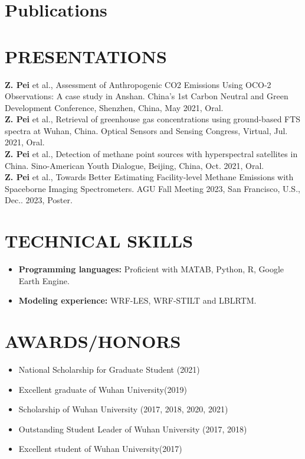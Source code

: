 \documentclass[a4paper,12pt]{article}
\begin{document}
\section{Publications}
\begin{refsection}
\nocite{*}
\printbibliography[heading=none]
\end{refsection}


\section{PRESENTATIONS}
\noindent[1]\quad\textbf{Z. Pei}  et al., Assessment of Anthropogenic CO2 Emissions Using OCO-2 Observations: A case study in Anshan. China's 1st Carbon Neutral and Green Development Conference, Shenzhen, China, May 2021, Oral. \\
\noindent[2]\quad\textbf{Z. Pei} et al., Retrieval of greenhouse gas concentrations using ground-based FTS spectra at Wuhan, China. Optical Sensors and Sensing Congress, Virtual, Jul. 2021, Oral. \\
\noindent[3]\quad\textbf{Z. Pei} et al., Detection of methane point sources with hyperspectral satellites in China. Sino-American Youth Dialogue, Beijing, China, Oct. 2021, Oral.\\
\noindent[4]\quad\textbf{Z. Pei} et al., Towards Better Estimating Facility-level Methane Emissions with Spaceborne Imaging Spectrometers. AGU Fall Meeting 2023, San Francisco, U.S., Dec.. 2023, Poster.\\

\section{TECHNICAL SKILLS}
\begin{itemize}[noitemsep,nolistsep,leftmargin=*]
	\item {\noindent \textbf{Programming languages:} Proficient with MATAB, Python, R, Google Earth Engine. }
	\item {\noindent \textbf{Modeling experience:} WRF-LES, WRF-STILT and LBLRTM. }
\end{itemize}

\section{AWARDS/HONORS}
\begin{itemize}[noitemsep,nolistsep,leftmargin=*]
	\item {National Scholarship for Graduate Student (2021)}
	\item {Excellent graduate of Wuhan University(2019)}
	\item {Scholarship of Wuhan University (2017, 2018, 2020, 2021)}
	\item {Outstanding Student Leader of Wuhan University (2017, 2018)}
	\item {Excellent student of Wuhan University(2017)}
\end{itemize}
\end{document}
